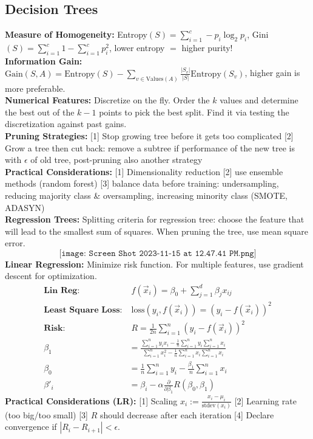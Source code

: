 \subsection{Decision Trees}
\textbf{Measure of Homogeneity:} Entropy$(S) = \sum_{i=1}^c -p_i \log_2 p_i$, Gini$(S) = \sum_{i=1}^c 1-\sum_{i=1}^c p_i^2$, lower entropy $=$ higher purity!\\
\textbf{Information Gain:} $\text{Gain}(S,A) = \text{Entropy}(S) - \sum_{v \in \text{Values}(A)} \frac{|S_v|}{|S|} \text{Entropy}(S_v)$, higher gain is more preferable.\\
\textbf{Numerical Features:} Discretize on the fly. Order the $k$ values and determine the best out of the $k-1$ points to pick the best split. Find it via testing the discretization against past gains.\\
\textbf{Pruning Strategies:} [1] Stop growing tree before it gets too complicated [2] Grow a tree then cut back: remove a subtree if performance of the new tree is with $\epsilon$ of old tree, post-pruning also another strategy\\
\textbf{Practical Considerations:} [1] Dimensionality reduction [2] use ensemble methods (random forest) [3] balance data before training: undersampling, reducing majority class \& oversampling, increasing minority class (SMOTE, ADASYN)\\
\textbf{Regression Trees:} Splitting criteria for regression tree: choose the feature that will lead to the smallest sum of squares. When pruning the tree, use mean square error.
$$ 
\texttt{[image: Screen Shot 2023-11-15 at 12.47.41 PM.png]}
$$    
\textbf{Linear Regression:} Minimize risk function. For multiple features, use gradient descent for optimization. 
\begin{align*}
    \textbf{Lin Reg:}&\;f(\vec{x}_i) = \beta_0 + \sum_{j=1}^d \beta_jx_{ij}\\
    \textbf{Least Square Loss:}&\;\text{loss}(y_i,f(\vec{x}_i)) = (y_i-f(\vec{x}_i))^2\\
    \textbf{Risk:}&\;R = \frac{1}{2n} \sum_{i=1}^n  (y_i-f(\vec{x}_i))^2\\
    \beta_1 &= \frac{\sum_{i=1}^{n} y_ix_i - \frac{1}{n} \sum_{i=1}^{n} y_i \sum_{i=1}^{n} x_i}{\sum_{i=1}^{n} x_i^2 - \frac{1}{n} \sum_{i=1}^{n} x_i \sum_{i=1}^{n} x_i}\\
    \beta_0 &= \frac{1}{n} \sum_{i=1}^n y_i - \frac{\beta_1}{n} \sum_{i=1}^{n} x_i\\
    \beta'_i &= \beta_i - \alpha \frac{\partial}{\partial \beta_1} R(\beta_0,\beta_1)
\end{align*}
\textbf{Practical Considerations (LR):} [1] Scaling $x_i := \frac{x_i - \mu_i}{\text{stdev}(x_i)}$ [2] Learning rate (too big/too small) [3] $R$ should decrease after each iteration [4] Declare convergence if $|R_i - R_{i+1}| < \epsilon$. 
